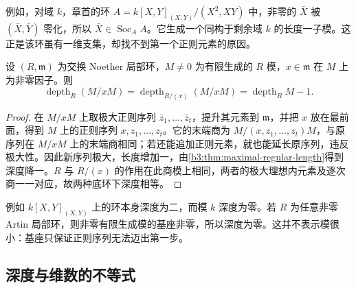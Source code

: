 例如，对域 \(k\)，章首的环 \(A=k[X,Y]_{(X,Y)}/(X^2,XY)\) 中，非零的 \(\bar X\) 被 \((\bar X,\bar Y)\) 零化，所以 \(\bar X\in\operatorname{Soc}_AA\)。它生成一个同构于剩余域 \(k\) 的长度一子模。这正是该环虽有一维支集，却找不到第一个正则元素的原因。

\begin{corollary}\label{b3:cor:regular-quotient-depth}
	设 \((R,\mathfrak m)\) 为交换 Noether 局部环，\(M\ne0\) 为有限生成的 \(R\) 模，\(x\in\mathfrak m\) 在 \(M\) 上为非零因子。则
	\[
		\operatorname{depth}_R(M/xM) =\operatorname{depth}_{R/(x)}(M/xM) =\operatorname{depth}_RM-1.
	\]
\end{corollary}
\begin{proof}
	在 \(M/xM\) 上取极大正则序列 \(\bar z_1,\ldots,\bar z_t\)，提升其元素到 \(\mathfrak m\)，并把 \(x\) 放在最前面，得到 \(M\) 上的正则序列 \(x,z_1,\ldots,z_t\)。它的末端商为 \(M/(x,z_1,\ldots,z_t)M\)，与原序列在 \(M/xM\) 上的末端商相同；若还能追加正则元素，就也能延长原序列，违反极大性。因此新序列极大，长度增加一，由\cref{b3:thm:maximal-regular-length}得到深度降一。\(R\) 与 \(R/(x)\) 的作用在此商模上相同，两者的极大理想内元素及逐次商一一对应，故两种底环下深度相等。
\end{proof}

例如 \(k[X,Y]_{(X,Y)}\) 上的环本身深度为二，而模 \(k\) 深度为零。若 \(R\) 为任意非零 Artin 局部环，则非零有限生成模的基座非零，所以深度为零。这并不表示模很小：基座只保证正则序列无法迈出第一步。

\subsection{深度与维数的不等式}
\label{b3:subsec:1601:03}

